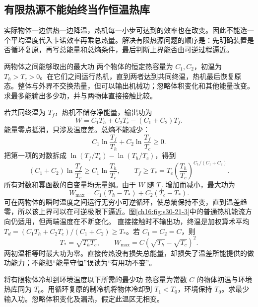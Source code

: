 {\subsection{有限热源不能始终当作恒温热库}
实际物体一边供热一边降温，热机每一小步可达到的效率也在改变。因此不能选一个平均温度代入卡诺效率再乘总热量。解决有限热源问题的顺序是：先明确装置是否循环复原，再写总能量和总熵条件，最后判断上界能否由可逆过程逼近。

\Needspace{180pt}
\begin{origexamplebox}{两物体之间能够取出的最大功}\label{ch16:ex:teaching-finite-work}
两个物体的恒定热容量为 $C_1,C_2$，初温为 $T_h>T_c>0$。在它们之间运行热机，直到两者达到共同终温，热机最后恢复原态。整体与外界不交换热量，但可以输出机械功；忽略体积变化和其他能量改变。求最多能输出多少功，并与两物体直接接触比较。

\ThQFiniteWork
\end{origexamplebox}
\Needspace{65pt}
\begin{xesolution}
\ThAFiniteWork

若共同终温为 $T_f$，热机不储存净能量，输出功为
\[
 W=C_1T_h+C_2T_c-(C_1+C_2)T_f.
\]
能量零点抵消，只涉及温度差。总熵不能减少：
\[
 C_1\ln\frac{T_f}{T_h}+C_2\ln\frac{T_f}{T_c}\ge0.
\]
把第一项的对数拆成 $\ln(T_f/T_c)-\ln(T_h/T_c)$，得到
\[
 (C_1+C_2)\ln\frac{T_f}{T_c}\ge C_1\ln\frac{T_h}{T_c},\qquad
 T_f\ge T_*=T_c\left(\frac{T_h}{T_c}\right)^{C_1/(C_1+C_2)}.
\]
所有对数和幂函数的自变量均无量纲。由于 $W$ 随 $T_f$ 增加而减小，最大功为
\[
 W_{\max}=C_1(T_h-T_*)+C_2(T_c-T_*).
\]
可在两物体的瞬时温度之间运行无穷小可逆循环，使总熵保持不变，直到温差趋零，所以该上界可以在可逆极限下逼近。图\ref{ch16:fig:s30-21-3}中的普通热机能流方向仍适用，但两端温度在不断变化。
直接接触时不输出功，终温是加权算术平均 $T_d=(C_1T_h+C_2T_c)/(C_1+C_2)\ge T_*$。若 $C_1=C_2=C$，则
\[
 T_*=\sqrt{T_hT_c},\qquad W_{\max}=C(\sqrt{T_h}-\sqrt{T_c})^2.
\]
两初温相等时最大功为零。直接传热没有损失总能量，却损失了温差所能提供的做功能力；不能把“能量守恒”误读为“有用功不变”。
\end{xesolution}

\Needspace{180pt}
\begin{origexamplebox}{将有限物体冷却到环境温度以下所需的最少功}\label{ch16:ex:teaching-cooling-work}
热容量为常数 $C$ 的物体初温与环境热库同为 $T_0$。用循环复原的制冷机将物体冷却到 $T_1<T_0$，环境保持 $T_0$。求最少输入功。忽略体积变化及漏热，假定此温区无相变。

\ThQCooling
\end{origexamplebox}
\Needspace{65pt}
\begin{xesolution}
\ThACooling


\end{xesolution}}
